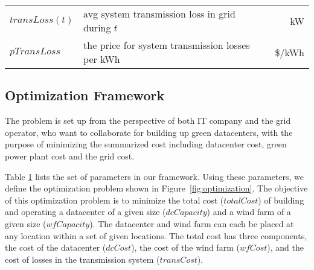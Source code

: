 \begin{table}[ht]
\begin{center}
\begin{tabular}{|l|p{1.9in}|r|}
\hline \hline
$transLoss(t)$  & avg system transmission loss in grid during $t$ & kW \\
$pTransLoss$ & the price for system transmission losses per kWh & \$/kWh \\
\hline
\end{tabular}
\label{tab:par_setting}
\end{center}
\end{table}

\subsection{Optimization Framework}

The problem is set up from the perspective of both IT company and the grid operator, who want to collaborate for building up green datacenters, with the purpose of minimizing the summarized cost including datacenter cost, green power plant cost and the grid cost.

Table \ref{tab:par_setting} lists the set of parameters in our framework.  Using these parameters, we define the optimization problem shown in Figure~\ref{fig:optimization}.  The objective of this optimization problem is to minimize the total cost ($totalCost$) of building and operating a datacenter of a given size ($dcCapacity$) and a wind farm of a given size ($wfCapacity$).  The datacenter and wind farm can each be placed at any location within a set of given locations.  The total cost has three components, the cost of the datacenter ($dcCost$), the cost of the wind farm ($wfCost$), and the cost of losses in the transmission system ($transCost$).

